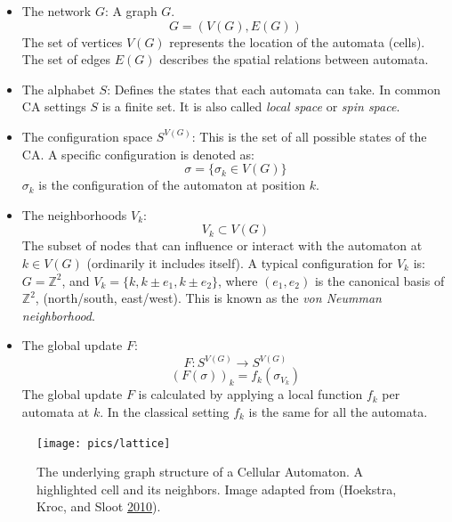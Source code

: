 \documentclass[
]{book}
\begin{document}
\begin{itemize}
\item
  The network \(G\):
  A graph \(G\).
  \[ G = (V(G), E(G)) \]
  The set of vertices \(V(G)\) represents the location of the automata (cells). The set of edges \(E(G)\) describes the spatial relations between automata.
\item
  The alphabet \(S\):
  Defines the states that each automata can take. In common CA settings \(S\) is a finite set. It is also called \emph{local space} or \emph{spin space}.
\item
  The configuration space \(S^{V(G)}\):
  This is the set of all possible states of the CA. A specific configuration is denoted as:
  \[ \sigma = \{\sigma_k \in V(G)\} \]
  \(\sigma_k\) is the configuration of the automaton at position \(k\).
\item
  The neighborhoods \(V_k\):
  \[ V_k \subset  V(G) \]
  The subset of nodes that can influence or interact with the automaton at \(k \in V(G)\) (ordinarily it includes itself). A typical configuration for \(V_k\) is: \(G = \mathds{Z}^2\), and \(V_k = \{k, k \pm e_1, k \pm e_2\}\), where \((e_1, e_2)\) is the canonical basis of \(\mathds{Z}^2\), (north/south, east/west). This is known as the \emph{von Neumman neighborhood}.
\item
  The global update \(F\):
  \[ F: S^{V(G)} \rightarrow S^{V(G)} \]
  \[ (F(\sigma))_k = f_k(\sigma_{V_k}) \]
  The global update \(F\) is calculated by applying a local function \(f_k\) per automata at \(k\). In the classical setting \(f_k\) is the same for all the automata.
\end{itemize}




\begin{figure}

{\centering \texttt{[image: pics/lattice]} 

}

\caption{The underlying graph structure of a Cellular Automaton.
A highlighted cell and its neighbors. Image adapted from (Hoekstra, Kroc, and Sloot \protect\hyperlink{ref-hoekstra2010simulating}{2010}).}\label{fig:CA-lattice}
\end{figure}
\end{document}
